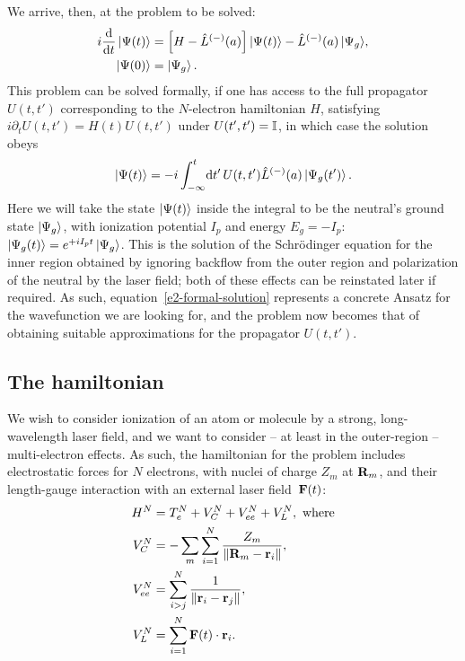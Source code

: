 We arrive, then, at the problem to be solved:
\begin{subequations}
\label{e2-problem}
\begin{align}
i\frac{\mathrm{d}}{\mathrm{d} t}\ket{\Psi(t)}
&=\left[H - \hat{L}^{(-)}(a)\right]\ket{\Psi(t)} -\hat{L}^{(-)}(a)\ket{\Psi_g}\!,
\\
\ket{\Psi(0)}&=\ket{\Psi_g}.
\end{align}
\end{subequations}
This problem can be solved formally, if one has access to the full propagator $U(t,t')$ corresponding to the $N$-electron hamiltonian $H$, satisfying $i\partial_t U(t,t') = H(t) U(t,t')$ under $U(t',t')=\mathbb{I}$, in which case the solution obeys
\begin{equation}
\ket{\Psi(t)}=-i\int_{-\infty}^t \!\mathrm{d} t' \, U(t,t')\hat{L}^{(-)}(a)\ket{\Psi_g(t')}.
\label{e2-formal-solution}
\end{equation}
Here we will take the state $\ket{\Psi(t)}$ inside the integral to be the neutral's ground state $\ket{\Psi_g}$, with ionization potential $I_p$ and energy $E_g=-I_p$: $\ket{\Psi_g(t)}= e^{+iI_p t}\ket{\Psi_g}$. This is the solution of the Schrödinger equation for the inner region obtained by ignoring backflow from the outer region and polarization of the neutral by the laser field; both of these effects can be reinstated later if required. As such, equation~\eqref{e2-formal-solution} represents a concrete Ansatz for the wavefunction we are looking for, and the problem now becomes that of obtaining suitable approximations for the propagator $U(t,t')$.




\subsection{The hamiltonian}
We wish to consider ionization of an atom or molecule by a strong, long-wavelength laser field, and we want to consider -- at least in the outer-region -- multi-electron effects. As such, the hamiltonian for the problem includes electrostatic forces for $N$ electrons, with nuclei of charge $Z_m$ at $\vb R_m$, and their length-gauge interaction with an external laser field~$\vb F(t)$:
\begin{subequations}
\label{e2-totalhamiltonian}
\begin{align}
H^N&=T_e^N+V_C^N+V_{ee}^N+V_L^N,\textrm{ where}\\
V_C^N&=-\sum_m \sum_{i=1}^N \frac{Z_m}{\|\vb{R}_m-\vb{r}_i\|},\\
V_{ee}^N&=\sum_{i>j}^N \frac{1}{\|\vb{r}_i-\vb{r}_j\|},\label{e2-V-ee-definition}\\
V_L^N&=\sum_{i=1}^N \vb{F}(t)\cdot \vb{r}_i.
\end{align}
\end{subequations}

